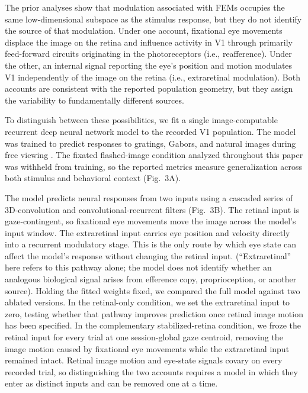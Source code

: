 \documentclass{lite}
\begin{document}
The prior analyses show that modulation associated with FEMs occupies the same low-dimensional subspace as the stimulus response, but they do not identify the source of that modulation. Under one account, fixational eye movements displace the image on the retina and influence activity in V1 through primarily feed-forward circuits originating in the photoreceptors (i.e., reafference). Under the other, an internal signal reporting the eye's position and motion modulates V1 independently of the image on the retina (i.e., extraretinal modulation). Both accounts are consistent with the reported population geometry, but they assign the variability to fundamentally different sources.

To distinguish between these possibilities, we fit a single image-computable recurrent deep neural network model to the recorded V1 population. The model was trained to predict responses to gratings, Gabors, and natural images during free viewing \cite{yates2023detailed}. The fixated flashed-image condition analyzed throughout this paper was withheld from training, so the reported metrics measure generalization across both stimulus and behavioral context (Fig.~3A).

The model predicts neural responses from two inputs using a cascaded series of 3D-convolution and convolutional-recurrent filters (Fig.~3B). The retinal input is gaze-contingent, so fixational eye movements move the image across the model's input window. The extraretinal input carries eye position and velocity directly into a recurrent modulatory stage. This is the only route by which eye state can affect the model's response without changing the retinal input. (``Extraretinal'' here refers to this pathway alone; the model does not identify whether an analogous biological signal arises from efference copy, proprioception, or another source). Holding the fitted weights fixed, we compared the full model against two ablated versions. In the retinal-only condition, we set the extraretinal input to zero, testing whether that pathway improves prediction once retinal image motion has been specified. In the complementary stabilized-retina condition, we froze the retinal input for every trial at one session-global gaze centroid, removing the image motion caused by fixational eye movements while the extraretinal input remained intact. Retinal image motion and eye-state signals covary on every recorded trial, so distinguishing the two accounts requires a model in which they enter as distinct inputs and can be removed one at a time.
\end{document}
